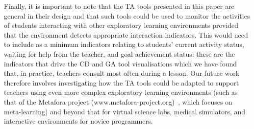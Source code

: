 Finally, it is important to note that the TA tools presented in this
paper are general in their design and that such tools could be used to
monitor the activities of students interacting with other exploratory
learning environments provided that the environment 
detects appropriate interaction indicators.
This would need to include as a minimum indicators relating to 
students' current activity status, 
waiting for help from the teacher, and goal
achievement status: 
these are the indicators that drive the CD and GA tool visualisations 
which we have found that, in practice, teachers consult most often during a lesson. 
Our future work therefore involves investigating how the TA tools
could be adapted to support teachers using even more complex
exploratory learning environments (such as that of the Metafora
project (www.metafora-project.org)~\cite{Dragon13}, which focuses on
meta-learning) and beyond that for virtual science labs, medical simulators, 
and interactive environments for novice programmers.

